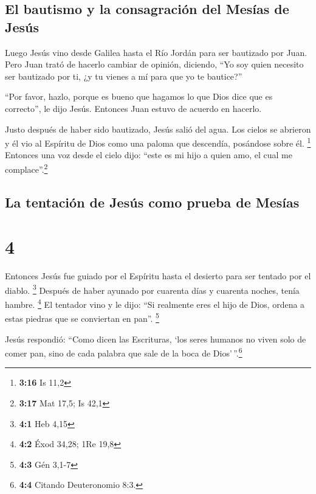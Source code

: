 \hypertarget{el-bautismo-y-la-consagraciuxf3n-del-mesuxedas-de-jesuxfas}{%
\subsection{El bautismo y la consagración del Mesías de
Jesús}\label{el-bautismo-y-la-consagraciuxf3n-del-mesuxedas-de-jesuxfas}}

 Luego Jesús vino desde Galilea hasta el Río Jordán para
ser bautizado por Juan.  Pero Juan trató de hacerlo
cambiar de opinión, diciendo, ``Yo soy quien necesito ser bautizado por
ti, ¿y tu vienes a mí para que yo te bautice?''

 ``Por favor, hazlo, porque es bueno que hagamos lo que
Dios dice que es correcto'', le dijo Jesús. Entonces Juan estuvo de
acuerdo en hacerlo.

 Justo después de haber sido bautizado, Jesús salió del
agua. Los cielos se abrieron y él vio al Espíritu de Dios como una
paloma que descendía, posándose sobre él. \footnote{\textbf{3:16} Is
  11,2}  Entonces una voz desde el cielo dijo: ``este es
mi hijo a quien amo, el cual me complace''.\footnote{\textbf{3:17} Mat
  17,5; Is 42,1}

\hypertarget{la-tentaciuxf3n-de-jesuxfas-como-prueba-de-mesuxedas}{%
\subsection{La tentación de Jesús como prueba de
Mesías}\label{la-tentaciuxf3n-de-jesuxfas-como-prueba-de-mesuxedas}}

\hypertarget{section-3}{%
\section{4}\label{section-3}}

 Entonces Jesús fue guiado por el Espíritu hasta el
desierto para ser tentado por el diablo. \footnote{\textbf{4:1} Heb 4,15}
 Después de haber ayunado por cuarenta días y cuarenta
noches, tenía hambre. \footnote{\textbf{4:2} Éxod 34,28; 1Re 19,8}
 El tentador vino y le dijo: ``Si realmente eres el hijo
de Dios, ordena a estas piedras que se conviertan en pan''. \footnote{\textbf{4:3}
  Gén 3,1-7}

 Jesús respondió: ``Como dicen las Escrituras, `los seres
humanos no viven solo de comer pan, sino de cada palabra que sale de la
boca de Dios'\,''.\footnote{\textbf{4:4} Citando Deuteronomio 8:3.}

